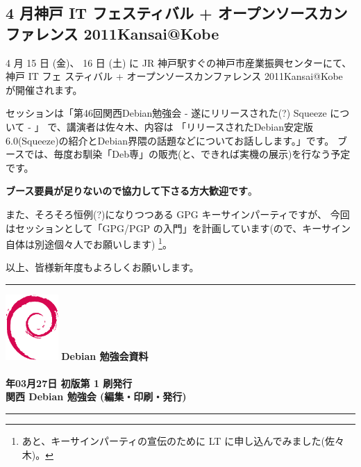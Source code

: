 \documentclass[mingoth,a4paper]{jsarticle}
\newcommand{\debmtgyear}{2011}
\newcommand{\debmtgdate}{27}
\newcommand{\debmtgmonth}{03}
\begin{document}

\subsection{4 月神戸 IT フェスティバル + オープンソースカンファレンス 2011Kansai@Kobe}

4 月 15 日 (金)、 16 日 (土) に JR 神戸駅すぐの神戸市産業振興センターにて、 神戸 IT フェ
スティバル + オープンソースカンファレンス 2011Kansai@Kobe が開催されます。

セッションは「第46回関西Debian勉強会  - 遂にリリースされた(?) Squeeze について - 」
で、講演者は佐々木、内容は
「リリースされたDebian安定版 6.0(Squeeze)の紹介とDebian界隈の話題などについてお話しします。」です。
ブースでは、毎度お馴染「Deb専」の販売(と、できれば実機の展示)を行なう予定です。
\begin{center}
  {\bf{ブース要員が足りないので協力して下さる方大歓迎です}}。
\end{center}

また、そろそろ恒例(?)になりつつある GPG キーサインパーティですが、
今回はセッションとして「GPG/PGP の入門」を計画しています(ので、キーサイン自体は別途個々人でお願いします)
\footnote{あと、キーサインパーティの宣伝のために LT に申し込んでみました(佐々木)。}。

以上、皆様新年度もよろしくお願いします。

\mbox{}\newpage

\printindex
 \cleartooddpage

 \begin{minipage}[b]{0.2\hsize}
 \end{minipage}
 \begin{minipage}[b]{0.8\hsize}

 \vspace*{15cm}
 \rule{\hsize}{1mm}
 \vspace{2mm}
 \includegraphics[width=2cm]{image200502/openlogo-nd.eps}
 \noindent \Large \bf Debian 勉強会資料\\ \\
 \noindent \normalfont \debmtgyear{}年\debmtgmonth{}月\debmtgdate{}日 \hspace{5mm}  初版第 1 刷発行\\
 \noindent \normalfont 関西 Debian 勉強会 (編集・印刷・発行)\\
 \rule{\hsize}{1mm}
 \end{minipage}
\end{document}
